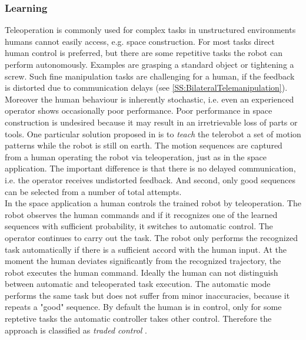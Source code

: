 \documentclass[a4paper,twoside, openright,12pt]{report}
\begin{document}
\subsubsection{Learning}
Teleoperation is commonly used for complex tasks in unstructured environments humans cannot easily access, e.g. space construction. For most tasks direct human control is preferred, but there are some repetitive tasks the robot can perform autonomously. Examples are grasping a standard object or tightening a screw. Such fine manipulation tasks are challenging for a human, if the feedback is distorted due to communication delays (see \ref{SS:BilateralTelemanipulation}). Moreover the human behaviour is inherently stochastic, i.e. even an experienced operator shows occasionally poor performance. Poor performance in space construction is undesired because it may result in an irretrievable loss of parts or tools. One particular solution proposed in \cite{Yang1994} is to \emph{teach} the telerobot a set of motion patterns while the robot is still on earth. The motion sequences are captured from a human operating the robot via teleoperation, just as in the space application. The important difference is that there is no delayed communication, i.e. the operator receives undistorted feedback. And second, only good sequences can be selected from a number of total attempts.\\
In the space application a human controls the trained robot by teleoperation. The robot observes the human commands and if it recognizes one of the learned sequences with sufficient probability, it switches to automatic control. The operator continues to carry out the task. The robot only performs the recognized task automatically if there is a sufficient accord with the human input. At the moment the human deviates significantly from the recognized trajectory, the robot executes the human command. Ideally the human can not distinguish between automatic and teleoperated task execution. The automatic mode performs the same task but does not suffer from minor inaccuracies, because it repeats a "good" sequence. By default the human is in control, only for some reptetive tasks the automatic controller takes other control. Therefore the approach is classified as \emph{traded control} \cite{Sheridian1992}.\\
\end{document}
